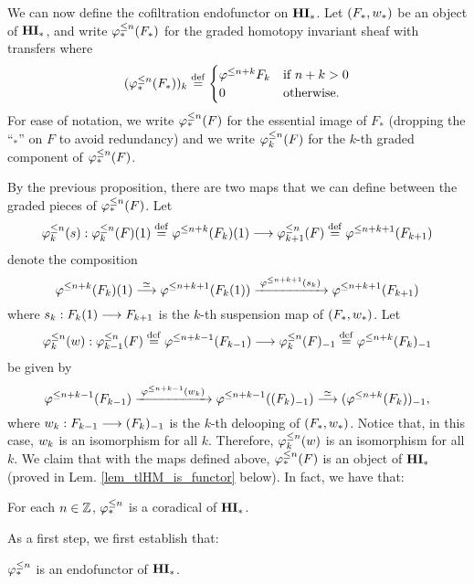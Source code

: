 We can now define the cofiltration endofunctor on $\HM$. Let
$(F_*, \deloop_*)$ be an object of $\HM$, and write $\tlHM{n}(F_*)$ 
for the graded homotopy invariant sheaf with transfers where
\[
(\tlHM{n}(F_*))_k \defeq
\begin{cases}
   \tlHI{n + k}F_k & \textrm{if } n + k > 0 \\
   0               & \textrm{otherwise}.
\end{cases}
\]
For ease of notation, we write $\tlHM{n}(F)$ for the essential 
image of $F_*$ (dropping the ``$_*$'' on $F$ to avoid 
redundancy) and we write $\tlHM[k]{n}(F)$ for the $k$-th graded 
component of $\tlHM{n}(F)$.

By the previous proposition, there are two maps that we can
define between the graded pieces of $\tlHM{n}(F)$. Let
\[
\suspTL[k]{n} : \LHI{\tlHM[k]{n}(F)} \defeq 
   \LHI{\tlHI{n + k}(F_k)} \to \tlHM[k + 1]{n}(F) \defeq 
   \tlHI{n + k + 1}(F_{k + 1})
\]
denote the composition
\begin{equation}\label{eq_susp_def}
\LHI{\tlHI{n + k}(F_k)} \stackrel{\simeq}{\to} 
   \tlHI{n + k + 1}(\LHI{F_k}) 
   \xrightarrow{\;\tlHI{n + k + 1}(\susp_k)\;} 
   \tlHI{n + k + 1}(F_{k + 1})
\end{equation}
where $\susp_k: \LHI{F_k} \to F_{k + 1}$ is the $k$-th suspension 
map of $(F_*, \deloop_*)$. Let
\[
\deloopTL[k]{n} : \tlHM[k - 1]{n}(F) \defeq 
   \tlHI{n + k - 1}(F_{k - 1}) \to \RHI{\tlHM[k]{n}(F)} \defeq 
   \RHI{\tlHI{n + k}(F_{k})} 
\]
be given by
\begin{equation}\label{eq_deloop_def}
\tlHI{n + k - 1}(F_{k - 1})
   \xrightarrow{\;\tlHI{n + k - 1}(\deloop_k)\;} 
   \tlHI{n + k - 1}(\RHI{(F_k)}) \stackrel{\simeq}{\to} 
   \RHI{(\tlHI{n + k}(F_k))},
\end{equation}
where $\deloop_k: F_{k - 1} \to \RHI{(F_k)}$ is the $k$-th delooping
of $(F_*, \deloop_*)$. Notice that, in this case, $\deloop_k$ is
an isomorphism for all $k$. Therefore, $\deloopTL[k]{n}$ is an 
isomorphism for all $k$. We claim that with the maps defined above,
$\tlHM{n}(F)$ is an object of $\HM$ (proved in Lem. 
\ref{lem_tlHM_is_functor} below). In fact, we have that:

\begin{thm}\label{thm_tlHM_funct}
For each $n \in \Z$, $\tlHM{n}$ is a coradical of $\HM$.
\end{thm}

As a first step, we first establish that:

\begin{lem}\label{lem_tlHM_is_functor}
$\tlHM{n}$ is an endofunctor of $\HM$.
\end{lem}

